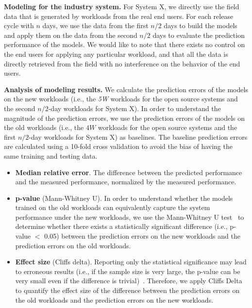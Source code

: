 \noindent\textbf{Modeling for the industry system. }
For System X, we directly use the field data that is generated by workloads from the real end users. For each release cycle with $n$ days, we use the data from the first $n/2$ days to build the models and apply them on the data from the second $n/2$ days to evaluate the prediction performance of the models. We would like to note that there exists no control on the end users for applying any particular workload, and that all the data is directly retrieved from the field with no interference on the behavior of the end users. 

\noindent\textbf{Analysis of modeling results. }
We calculate the prediction errors of the models on the new workloads (i.e., the \emph{5W} workloads for the open source systems and the second $n/2$-day workloads for System X).
In order to understand the magnitude of the prediction errors, we use the prediction errors of the models on the old workloads (i.e., the $4W$ workloads for the open source systems and the first $n/2$-day workloads for System X) as baselines. The baseline prediction errors are calculated using a 10-fold cross validation to avoid the bias of having the same training and testing data.  
\begin{itemize}
    \item \textbf{Median relative error}. The difference between the predicted performance and the measured performance, normalized by the measured performance.
    \item \textbf{p-value} (Mann-Whitney U). In order to understand whether the models trained on the old workloads can equivalently capture the system performance under the new workloads, we use the Mann-Whitney U test~\citep{nachar2008mann} to determine whether there exists a statistically significant difference (i.e., p-value $<$ 0.05) between the prediction errors on the new workloads and the prediction errors on the old workloads. 
    \item \textbf{Effect size} (Cliff\textquotesingle s delta). Reporting only the statistical significance may lead to erroneous results (i.e., if the sample size is very large, the p-value can be very small even if the difference is trivial)~\citep{sullivan2012using}. Therefore, we apply Cliff\textquotesingle s Delta~\citep{cliff1996ordinal} to quantify the effect size of the difference between the prediction errors on the old workloads and the prediction errors on the new workloads. 
\end{itemize}

